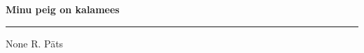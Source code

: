 \documentclass[10pt]{book}
\begin{document}
{
  \samepage
  \raggedbottom
  \raggedright
  \sloppy


  \vspace{0.2in}

  \noindent\begin{minipage}{.1\textwidth}
    \hfill\vspace{0.1in}
  \end{minipage}%
  \noindent\begin{minipage}{.8\textwidth}
    \centering
    \bfseries
    \large Minu peig on kalamees
  \end{minipage}%
  \noindent\begin{minipage}{.1\textwidth}
      \hfill\vspace{0.1in}
  \end{minipage}

  \nopagebreak[4]
  \vspace{0.1in}
  \nopagebreak[4]
  \hrule height 0.05ex
  \nopagebreak[4]
  \vspace{-0.05in}

  {\footnotesize None \hfill R. P\"ats }\\
  \vspace{0.01in}



}
\end{document}
